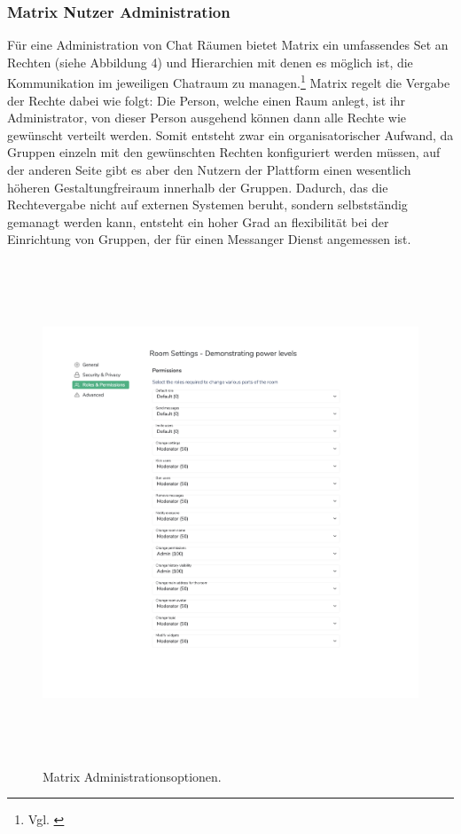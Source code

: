 \subsubsection{Matrix Nutzer Administration}\label{chapter:vdmf}
Für eine Administration von Chat Räumen bietet Matrix ein umfassendes Set an Rechten (siehe Abbildung 4) und Hierarchien mit denen es möglich ist, die Kommunikation im jeweiligen Chatraum zu managen.\footnote{Vgl. \cite{Matrix.org2020}}  Matrix regelt die Vergabe der Rechte dabei wie folgt: Die Person, welche einen Raum anlegt, ist ihr Administrator, von dieser Person ausgehend können dann alle Rechte wie gewünscht verteilt werden. Somit entsteht zwar ein organisatorischer Aufwand, da Gruppen einzeln mit den gewünschten Rechten konfiguriert werden müssen, auf der anderen Seite gibt es aber den Nutzern der Plattform einen wesentlich höheren Gestaltungfreiraum innerhalb der Gruppen. Dadurch, das die Rechtevergabe nicht auf externen Systemen beruht, sondern selbstständig gemanagt werden kann, entsteht ein hoher Grad an flexibilität bei der Einrichtung von Gruppen, der für einen Messanger Dienst angemessen ist.

\begin{figure}[htb]
    \centering
    \includegraphics[height=15cm]{graphics/moderation3.png}
    \caption[Matrix Administrationsoptionen]{Matrix Administrationsoptionen.}
    \label{abb:UI}
\end{figure}
